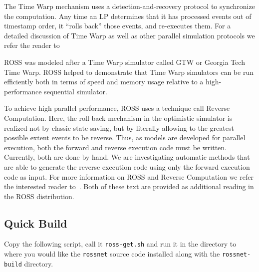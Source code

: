 \documentclass[12pt]{article}
\begin{document}
The Time Warp mechanism uses a detection-and-recovery protocol to synchronize
the computation.  Any time an LP determines that it has processed events out
of timestamp order, it ``rolls back'' those events, and re-executes them. For
a detailed discussion of Time Warp as well as other parallel simulation
protocols we refer the reader to~\cite{fujimoto-cacm-1990}

ROSS was modeled after a Time Warp simulator called GTW or Georgia Tech Time
Warp\cite{das-wsc-1994}. ROSS helped to demonstrate that Time Warp simulators
can be run efficiently both in terms of speed and memory usage relative to a
high-performance sequential simulator.

To achieve high parallel performance, ROSS uses a technique call Reverse
Computation. Here, the roll back mechanism in the optimistic simulator is
realized not by classic state-saving, but by literally allowing to the
greatest possible extent events to be reverse. Thus, as models are developed
for parallel execution, both the forward and reverse execution code must be
written. Currently, both are done by hand. We are investigating automatic
methods that are able to generate the reverse execution code using only the
forward execution code as input. For more information on ROSS and Reverse
Computation we refer the interested reader to~\cite{carothers-tomacs-1999,
  carothers-pads-2000}. Both of these text are provided as additional reading
in the ROSS distribution.

\subsection{Quick Build}

Copy the following script, call it {\tt ross-get.sh} and run it in
the directory to where you would like the {\tt rossnet} source code
installed along with the {\tt rossnet-build} directory.
\end{document}
